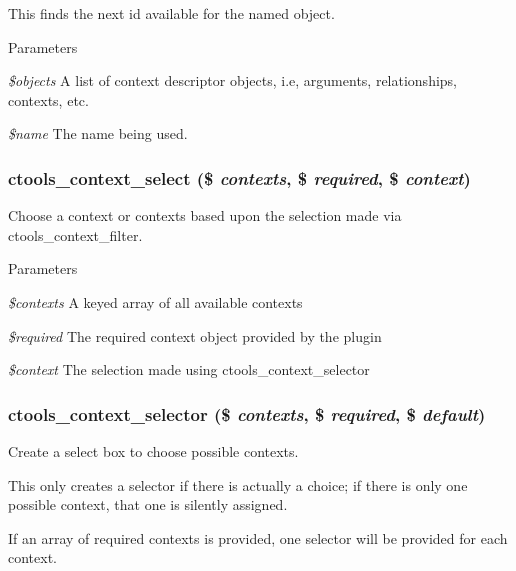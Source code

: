 This finds the next id available for the named object.


\begin{DoxyParams}{Parameters}
\item[{\em \$objects}]A list of context descriptor objects, i.e, arguments, relationships, contexts, etc. \item[{\em \$name}]The name being used. \end{DoxyParams}
\hypertarget{context_8inc_ae62023fbc6b102d866ac6ca3c3ee0842}{
\subsubsection[{ctools\_\-context\_\-select}]{\setlength{\rightskip}{0pt plus 5cm}ctools\_\-context\_\-select (\$ {\em contexts}, \/  \$ {\em required}, \/  \$ {\em context})}}
\label{context_8inc_ae62023fbc6b102d866ac6ca3c3ee0842}
Choose a context or contexts based upon the selection made via ctools\_\-context\_\-filter.


\begin{DoxyParams}{Parameters}
\item[{\em \$contexts}]A keyed array of all available contexts \item[{\em \$required}]The required context object provided by the plugin \item[{\em \$context}]The selection made using ctools\_\-context\_\-selector \end{DoxyParams}
\hypertarget{context_8inc_ae6e443459838081fda4508bb201627bc}{
\subsubsection[{ctools\_\-context\_\-selector}]{\setlength{\rightskip}{0pt plus 5cm}ctools\_\-context\_\-selector (\$ {\em contexts}, \/  \$ {\em required}, \/  \$ {\em default})}}
\label{context_8inc_ae6e443459838081fda4508bb201627bc}
Create a select box to choose possible contexts.

This only creates a selector if there is actually a choice; if there is only one possible context, that one is silently assigned.

If an array of required contexts is provided, one selector will be provided for each context.


